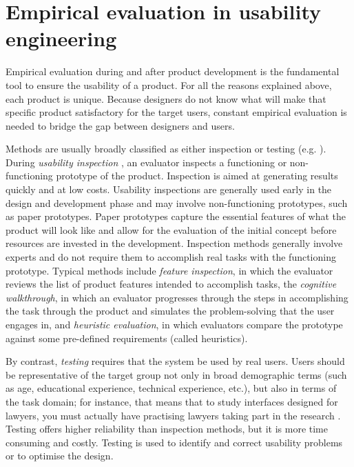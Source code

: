 \section{Empirical evaluation in usability engineering}

Empirical evaluation during and after product development is the fundamental tool to ensure the usability of a product. For all the reasons explained above, each product is unique. Because designers do not know what will make that specific product satisfactory for the target users, constant empirical evaluation is needed to bridge the gap between designers and users.

Methods are usually broadly classified as either inspection or testing (e.g. \cite{holzinger2005usability}). During \textit{usability inspection} \citep{nielsen1994usabilityinsp}, an evaluator inspects a functioning or non-functioning prototype of the product. Inspection is aimed at generating results quickly and at low costs. Usability inspections are generally used early in the design and development phase and may involve non-functioning prototypes, such as paper prototypes. Paper prototypes capture the essential features of what the product will look like and allow for the evaluation of the initial concept before resources are invested in the development. Inspection methods generally involve experts and do not require them to accomplish real tasks with the functioning prototype. Typical methods include \textit{feature inspection}, in which the evaluator reviews the list of product features intended to accomplish tasks, the \textit{cognitive walkthrough}, in which an evaluator progresses through the steps in accomplishing the task through the product and simulates the problem-solving that the user engages in, and \textit{heuristic evaluation}, in which evaluators compare the prototype against some pre-defined requirements (called heuristics).

By contrast, \textit{testing} requires that the system be used by real users. Users should be representative of the target group not only in broad demographic terms (such as age, educational experience, technical experience, etc.), but also in terms of the task domain; for instance, that means that to study interfaces designed for lawyers, you must actually have practising lawyers taking part in the research \citep[6]{lazar2017research}. Testing offers higher reliability than inspection methods, but it is more time consuming and costly. Testing is used to identify and correct usability problems or to optimise the design.

